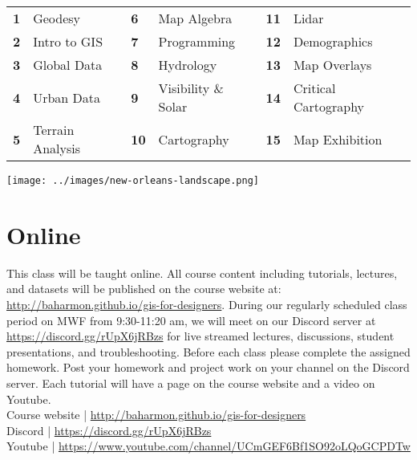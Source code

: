 \documentclass[11pt,article,oneside]{memoir}
\begin{document}
\begin{table}[H]
\begin{tabular}{l l @{\hskip 0.5cm} l l @{\hskip 0.5cm} l l}
\small
\textbf{1} & Geodesy & \textbf{6} & Map Algebra & \textbf{11} & Lidar\\
\textbf{2} & Intro to GIS & \textbf{7} & Programming & \textbf{12} & Demographics\\
\textbf{3} & Global Data & \textbf{8} & Hydrology & \textbf{13} & Map Overlays\\
\textbf{4} & Urban Data & \textbf{9} & Visibility \& Solar & \textbf{14} & Critical Cartography\\
\textbf{5} & Terrain Analysis & \textbf{10} & Cartography & \textbf{15} & Map Exhibition\\
\end{tabular}
\end{table}

\vspace*{1em}

\texttt{[image: ../images/new-orleans-landscape.png]}

\clearpage

\section{Online}

This class will be taught online.
All course content including tutorials, lectures, and datasets
will be published on the course website at:
\url{http://baharmon.github.io/gis-for-designers}.
During our regularly scheduled class period on MWF from 9:30-11:20 am,
we will meet on our Discord server at \url{https://discord.gg/rUpX6jRBzs}
for live streamed lectures, discussions, student presentations, and troubleshooting. 
Before each class please complete the assigned homework. 
Post your homework and project work 
on your channel on the Discord server. 
Each tutorial will have a page on the course website
and a video on Youtube.\\

\noindent
Course website | \url{http://baharmon.github.io/gis-for-designers}\\
Discord | \url{https://discord.gg/rUpX6jRBzs}\\
Youtube | \url{https://www.youtube.com/channel/UCmGEF6Bf1SO92oLQoGCPDTw}\\

\end{document}
